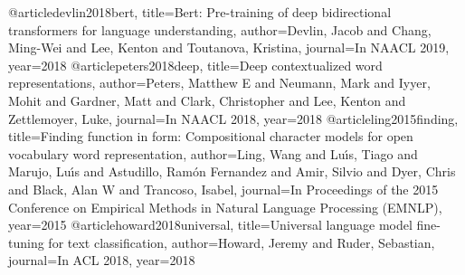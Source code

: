 @article{devlin2018bert,
  title={Bert: Pre-training of deep bidirectional transformers for language understanding},
  author={Devlin, Jacob and Chang, Ming-Wei and Lee, Kenton and Toutanova, Kristina},
  journal={In NAACL 2019},
  year={2018}
}
@article{peters2018deep,
  title={Deep contextualized word representations},
  author={Peters, Matthew E and Neumann, Mark and Iyyer, Mohit and Gardner, Matt and Clark, Christopher and Lee, Kenton and Zettlemoyer, Luke},
  journal={In NAACL 2018},
  year={2018}
}
@article{ling2015finding,
  title={Finding function in form: Compositional character models for open vocabulary word representation},
  author={Ling, Wang and Lu{\'\i}s, Tiago and Marujo, Lu{\'\i}s and Astudillo, Ram{\'o}n Fernandez and Amir, Silvio and Dyer, Chris and Black, Alan W and Trancoso, Isabel},
  journal={In Proceedings of the 2015 Conference on Empirical Methods
in Natural Language Processing (EMNLP)},
  year={2015}
}
@article{howard2018universal,
  title={Universal language model fine-tuning for text classification},
  author={Howard, Jeremy and Ruder, Sebastian},
  journal={In ACL 2018},
  year={2018}
}
